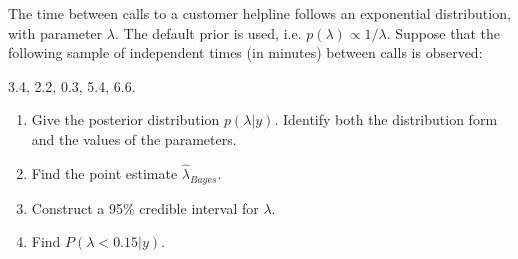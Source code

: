  \item The time between calls to a customer helpline follows an exponential distribution, with parameter $\lambda$. The default prior is used, i.e. $p(\lambda) \propto 1/ \lambda$.  Suppose that the following sample of independent times (in minutes) between calls is observed:
    
3.4, 2.2, 0.3, 5.4, 6.6. 
    
    \begin{enumerate}	 
      \item Give the posterior distribution  $p(\lambda | y)$. Identify both the distribution form and the values of the parameters. 
      \item Find the point estimate $\hat{\lambda}_{Bayes}$. 
      \item Construct a 95\% credible interval for $\lambda$. 
      \item Find $P(\lambda <0.15 |y)$.
\end{enumerate}
     
